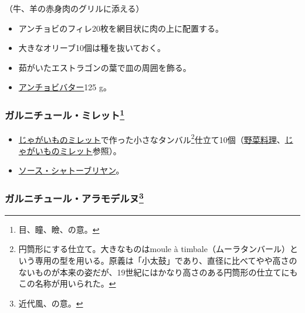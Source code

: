 \begin{recette}
（牛、羊の赤身肉のグリルに添える）

\begin{itemize}
\item
  アンチョビのフィレ20枚を網目状に肉の上に配置する。
\item
  大きなオリーブ10個は種を抜いておく。
\item
  茹がいたエストラゴンの葉で皿の周囲を飾る。
\item
  \protect\hyperlink{beurre-d-anchois}{アンチョビバター}125 g。
\end{itemize}

\hypertarget{garniture-mirette}{%
\subsubsection[ガルニチュール・ミレット]{\texorpdfstring{ガルニチュール・ミレット\footnote{目、瞳、瞼、の意。}}{ガルニチュール・ミレット}}\label{garniture-mirette}}



\begin{itemize}
\item
  \protect\hyperlink{pommes-de-terre-mirette}{じゃがいものミレット}で作った小さなタンバル\footnote{円筒形にする仕立て。大きなものはmoule
    à
    timbale（ムーラタンバール）という専用の型を用いる。原義は「小太鼓」であり、直径に比べてやや高さのないものが本来の姿だが、19世紀にはかなり高さのある円筒形の仕立てにもこの名称が用いられた。}仕立て10個（\protect\hyperlink{legumes}{野菜料理}、\protect\hyperlink{pommes-de-terre-mirette}{じゃがいものミレット}参照）。
\item
  \protect\hyperlink{sauce-chateaubriand}{ソース・シャトーブリヤン}。
\end{itemize}

\hypertarget{garniture-a-la-moderne}{%
\subsubsection[ガルニチュール・アラモデルヌ]{\texorpdfstring{ガルニチュール・アラモデルヌ\footnote{近代風、の意。}}{ガルニチュール・アラモデルヌ}}\label{garniture-a-la-moderne}}



\end{recette}

